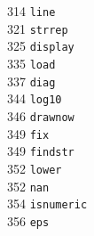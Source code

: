 \begin{footnotesize}
\begin{multicols}{3}
\vspace{-.153cm} 314   \hspace{.2cm} {\tt line                }     \\ %
\vspace{-.153cm} 321   \hspace{.2cm} {\tt strrep              }     \\ %
\vspace{-.153cm} 325   \hspace{.2cm} {\tt display             }     \\ %
\vspace{-.153cm} 335   \hspace{.2cm} {\tt load                }     \\ %
\vspace{-.153cm} 337   \hspace{.2cm} {\tt diag                }     \\ %
\vspace{-.153cm} 344   \hspace{.2cm} {\tt log10               }     \\ %
\vspace{-.153cm} 346   \hspace{.2cm} {\tt drawnow             }     \\ %
\vspace{-.153cm} 349   \hspace{.2cm} {\tt fix                 }     \\ %
\vspace{-.153cm} 349   \hspace{.2cm} {\tt findstr             }     \\ %
\vspace{-.153cm} 352   \hspace{.2cm} {\tt lower               }     \\ %
\vspace{-.153cm} 352   \hspace{.2cm} {\tt nan                 }     \\ %
\vspace{-.153cm} 354   \hspace{.2cm} {\tt isnumeric           }     \\ %
\vspace{-.153cm} 356   \hspace{.2cm} {\tt eps                 }     \\ %

\end{multicols}
\end{footnotesize}

